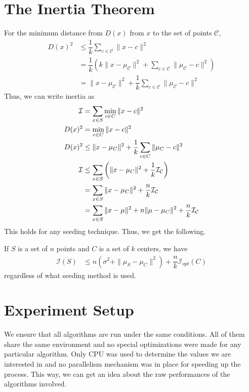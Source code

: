 \documentclass[twoside, 11pt]{article}
\newcommand{\X}{\mathbf{X}}
\newcommand{\C}{\mathcal{C}}
\newcommand{\I}{\mathcal{I}}
\begin{document}
	\section{The Inertia Theorem}
	For the minimum distance from $D(x)$ from $x$ to the set of points $\C$,
		\begin{align*}
			D(x)^2 & \leq \dfrac{1}{k}\sum_{c\in \C}\|x-c\|^2\\
					& = \dfrac{1}{k}\left(k\|x-\mu_{\C}\|^2+\sum_{c\in\C}\|\mu_{\C}-c\|^2\right)\\
					& = \|x-\mu_{\C}\|^2+\dfrac{1}{k}\sum_{c\in\C}\|\mu_{\C}-c\|^2
		\end{align*}
	Thus, we can write inertia as 
		\begin{align*}
			\cal I & = \sum_{x\in S}\min_{c\in C}\|x-c\|^2\\
			D(x)^2 & = \min_{c\in C}\|x-c\|^2\\
			D(x)^2 & \leq \|x-\mu_{C}\|^2+\dfrac{1}{k}\sum_{c\in C}\|\mu_{C}-c\|^2\\
			\cal I & \leq \sum_{x\in S}\left(\|x-\mu_C\|^2+\dfrac1k\cal I_C\right)\\
			& = \sum_{x\in S}\|x-\mu_C\|^2+\dfrac nk\cal I_C\\
			& = \sum_{x\in S}\|x-\mu\|^2+n\|\mu-\mu_C\|^2+\dfrac nk\cal I_C
		\end{align*}
	This holds for any seeding technique. Thus, we get the following.
		\begin{theorem}
			If $S$ is a set of $n$ points and $C$ is a set of $k$ centers, we have
				\begin{align*}
					\I(S) & \leq n(\sigma^2+\|\mu_S-\mu_C\|^2)+\dfrac{n}{k}\I_{opt}(C)
				\end{align*}
			regardless of what seeding method is used.
		\end{theorem}
	\section{Experiment Setup}
	We ensure that all algorithms are run under the same conditions. All of them share the same environment and no special optimizations were made for any particular algorithm. Only CPU was used to determine the values we are interested in and no parallelism mechanism was in place for speeding up the process. This way, we can get an idea about the raw performances of the algorithms involved.
	
\end{document}
